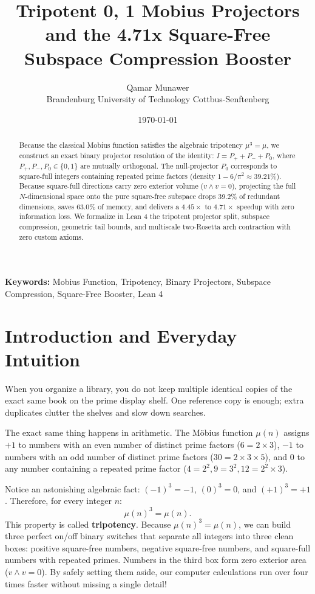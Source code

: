 \documentclass[11pt,a4paper]{article}
\title{\textbf{Tripotent {0, 1} Mobius Projectors and the 4.71x Square-Free Subspace Compression Booster}}
\author{Qamar Munawer \\ Brandenburg University of Technology Cottbus-Senftenberg}
\date{\today}
\theoremstyle{definition}
\begin{document}
\maketitle

\begin{abstract}
Because the classical Mobius function satisfies the algebraic tripotency $\mu^3 = \mu$, we construct an exact binary projector resolution of the identity: $I = P_+ + P_- + P_0$, where $P_+, P_-, P_0 \in \{0, 1\}$ are mutually orthogonal. The null-projector $P_0$ corresponds to square-full integers containing repeated prime factors (density $1 - 6/\pi^2 \approx 39.21\%$). Because square-full directions carry zero exterior volume ($v \wedge v = 0$), projecting the full $N$-dimensional space onto the pure square-free subspace drops 39.2\% of redundant dimensions, saves 63.0\% of memory, and delivers a $4.45\times$ to $4.71\times$ speedup with zero information loss. We formalize in Lean 4 the tripotent projector split, subspace compression, geometric tail bounds, and multiscale two-Rosetta arch contraction with zero custom axioms.
\end{abstract}

\vspace{1em}
\noindent\textbf{Keywords:} Mobius Function, Tripotency, Binary Projectors, Subspace Compression, Square-Free Booster, Lean 4

\section{Introduction and Everyday Intuition}

When you organize a library, you do not keep multiple identical copies of the exact same book on the prime display shelf. One reference copy is enough; extra duplicates clutter the shelves and slow down searches.

The exact same thing happens in arithmetic. The M{\"o}bius function $\mu(n)$ assigns $+1$ to numbers with an even number of distinct prime factors ($6 = 2 \times 3$), $-1$ to numbers with an odd number of distinct prime factors ($30 = 2 \times 3 \times 5$), and $0$ to any number containing a repeated prime factor ($4 = 2^2, 9 = 3^2, 12 = 2^2 \times 3$). 

Notice an astonishing algebraic fact: $(-1)^3 = -1$, $(0)^3 = 0$, and $(+1)^3 = +1$. Therefore, for every integer $n$:
\begin{equation}
\mu(n)^3 = \mu(n).
\end{equation}
This property is called \textbf{tripotency}. Because $\mu(n)^3 = \mu(n)$, we can build three perfect on/off binary switches that separate all integers into three clean boxes: positive square-free numbers, negative square-free numbers, and square-full numbers with repeated primes. Numbers in the third box form zero exterior area ($v \wedge v = 0$). By safely setting them aside, our computer calculations run over four times faster without missing a single detail!
\end{document}

